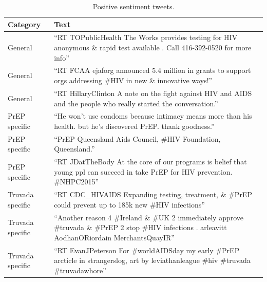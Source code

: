 \documentclass[conference]{IEEEtran}
\begin{document}
\begin{table}
\centering
\caption{Positive sentiment tweets.}
\begin{tabular}{|p{2.5cm}|p{12cm}|} \hline
Category & Text\\ \hline
General & ``RT TOPublicHealth The Works provides testing for HIV anonymous \& rapid test available . Call 416-392-0520 for more info''\\ \hline
General & ``RT FCAA ejaforg announced 5.4 million in grants to support orgs addressing \#HIV in new \& innovative ways!''\\ \hline
General & ``RT HillaryClinton A note on the fight against HIV and AIDS and the people who really started the conversation.''\\ \hline

PrEP specific & ``He won't use condoms because intimacy means more than his health. but he's discovered PrEP. thank goodness.''\\ \hline
PrEP specific & ``PrEP Queensland Aids Council, \#HIV Foundation, Queensland.''\\ \hline
PrEP specific & ``RT JDatTheBody At the core of our programs is belief that young ppl can succeed in take PrEP for HIV prevention. \#NHPC2015''\\ \hline

Truvada specific & ``RT CDC\_HIVAIDS Expanding testing, treatment, \& \#PrEP could prevent up to 185k new \#HIV infections''\\ \hline
Truvada specific & ``Another reason 4 \#Ireland \& \#UK 2 immediately approve \#truvada \& \#PrEP 2 stop \#HIV infections . arleavitt AodhanORiordain MerchantsQuayIR''\\ \hline
Truvada specific & ``RT EvanJPeterson For \#worldAIDSday my early \#PrEP arcticle in strangerslog, art by leviathanleague \#hiv \#truvada \#truvadawhore''\\ \hline

\hline\end{tabular}
\label{tbl:pos}
\end{table}
\end{document}
